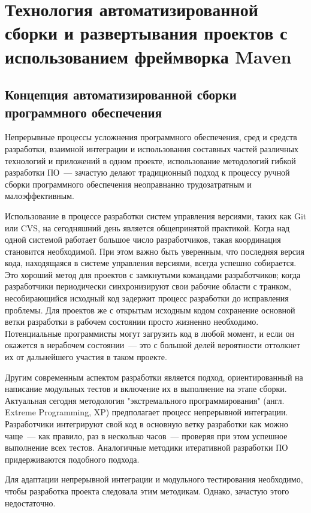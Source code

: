 \section{Технология автоматизированной сборки и развертывания проектов с использованием фреймворка Maven}
\subsection{Концепция автоматизированной сборки программного обеспечения}
Непрерывные процессы усложнения программного обеспечения, сред и средств разработки, взаимной интеграции и использования составных частей различных технологий и приложений в одном проекте, использование методологий гибкой разработки ПО~--- зачастую делают традиционный подход к процессу ручной сборки программного обеспечения неоправнанно трудозатратным и малоэффективным.

Использование в процессе разработки систем управления версиями, таких как Git или CVS, на сегодняшний день является общепринятой практикой. Когда над одной системой работает большое число разработчиков, такая координация становится необходимой.  При этом важно быть уверенным, что последняя версия кода, находящаяся в системе управления версиями, всегда успешно собирается. Это хороший метод для проектов с замкнутыми командами разработчиков; когда разработчики периодически синхронизируют свои рабочие области с транком, несобирающийся исходный код задержит процесс разработки до исправления проблемы. Для проектов же с открытым исходным кодом сохранение основной ветки разработки в рабочем состоянии просто жизненно необходимо. Потенциальные программисты могут загрузить код в любой момент, и если он окажется в нерабочем состоянии~--- это с большой делей вероятности оттолкнет их от дальнейшего участия в таком проекте.

Другим современным аспектом разработки является подход, ориентированный на написание модульных тестов и включение их в выполнение на этапе сборки.
	Актуальная сегодня методология "экстремального программирования" (англ. Extreme Programming, XP) предполагает процесс непрерывной интеграции. Разработчики интегрируют свой код в основную ветку разработки как можно чаще~--- как правило, раз в несколько часов~--- проверяя при этом успешное выполнение всех тестов. Аналогичные методики итеративной разработки ПО придерживаются подобного подхода.

Для адаптации непрерывной интеграции и модульного тестирования необходимо, чтобы разработка проекта следовала этим методикам. Однако, зачастую этого недостаточно.

